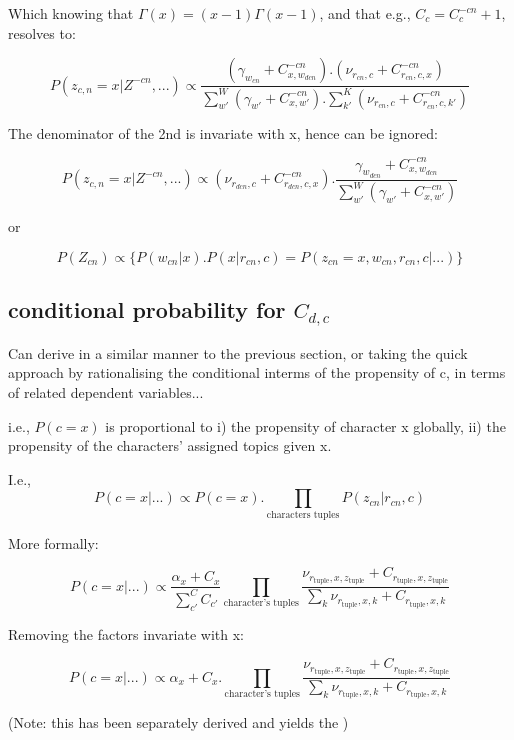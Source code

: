 \documentclass[a4paper]{article}
\begin{document}
Which knowing that $\Gamma(x)=(x-1)\Gamma(x-1)$, and that e.g., $C_{c} = C_{c}^{-cn} + 1$, resolves to:

$$
P(z_{c,n}=x| Z^{-cn}, ...) 
\propto 
\frac
{
    (\gamma_{w_{cn}} + C_{x,w_{dcn}}^{-cn}) . (\nu_{r_{cn},c} + C_{r_{cn},c,x}^{-cn})
}
{
    \sum_{w'}^W(\gamma_{w'} + C_{x,w'}^{-cn})
    . \sum_{k'}^K(\nu_{r_{cn},c} + C_{r_{cn},c,k'}^{-cn})
}
$$


The denominator of the 2nd is invariate with x, hence can be ignored:

$$
P(z_{c,n}=x| Z^{-cn}, ...) 
\propto 
(\nu_{r_{dcn},c} + C_{r_{dcn},c,x}^{-cn})
.
\frac
{
    \gamma_{w_{dcn}} + C_{x,w_{dcn}}^{-cn}
}
{
    \sum_{w'}^W(\gamma_{w'} + C_{x,w'}^{-cn})
}
$$

or 

$$
P(Z_{cn}) \propto \{
    P(w_{cn} | x) . P(x | r_{cn}, c) = P(z_{cn}=x, w_{cn}, r_{cn}, c | ...)
\}
$$


\subsection{conditional probability for $C_{d,c}$}

Can derive in a similar manner to the previous section, or taking the quick approach by rationalising the conditional interms of the propensity of c, in terms of related dependent variables...

i.e., $P(c=x)$ is proportional to i) the propensity of character x globally, ii) the propensity of the characters' assigned topics given x.

I.e., 
$$
P(c=x|...) \propto P(c=x) . \prod_{\text{characters tuples}} P(z_{cn} | r_{cn}, c)
$$

More formally:

$$
P(c=x | ...) \propto 
\frac{\alpha_x + C_{x}}{\sum_{c'}^{C} C_{c'}} 
\prod_{\text{character's tuples}}
\frac
{
    \nu_{r_{\text{tuple}},x,{z_{\text{tuple}}}} + C_{r_{\text{tuple}},x,z_{\text{tuple}}}
}
{
    \sum_k \nu_{r_{\text{tuple}}, x, k} + C_{r_{\text{tuple}},x,k}
}
$$

Removing the factors invariate with x:

$$
P(c=x | ...) \propto 
\alpha_x + C_{x}
. 
\prod_{\text{character's tuples}}
\frac
{
    \nu_{r_{\text{tuple}},x,{z_{\text{tuple}}}} + C_{r_{\text{tuple}},x,z_{\text{tuple}}}
}
{
    \sum_k \nu_{r_{\text{tuple}}, x, k} + C_{r_{\text{tuple}},x,k}
}
$$

(Note: this has been separately derived and yields the )






\end{document}
